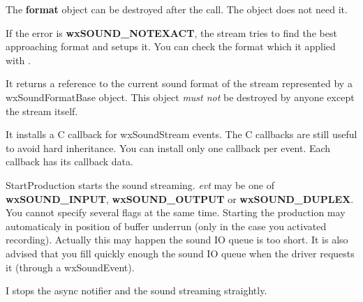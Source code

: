 
The {\bf format} object can be destroyed after the call. The object does not need it.


If the error is {\bf wxSOUND\_NOTEXACT}, the stream tries to find the best
approaching format and setups it. You can check the format which it applied
with .

\label{wxsoundstreamgetsoundformat}

It returns a reference to the current sound format of the stream represented by a
wxSoundFormatBase object. This object {\it must not} be destroyed by anyone except
the stream itself.

\label{wxsoundstreamregister}


It installs a C callback for wxSoundStream events. The C callbacks are still
useful to avoid hard inheritance. You can install only one callback per event.
Each callback has its callback data.

\label{wxsoundstreamstartproduction}


StartProduction starts the sound streaming. {\it evt} may be one of 
{\bf wxSOUND\_INPUT}, {\bf wxSOUND\_OUTPUT} or {\bf wxSOUND\_DUPLEX}.
You cannot specify several flags at the same time. Starting the production
may automaticaly in position of buffer underrun (only in the case you activated
recording). Actually this may happen the sound IO queue is too short.
It is also advised that you fill quickly enough the sound IO queue when the
driver requests it (through a wxSoundEvent).

\label{wxsoundstreamstopproduction}


I stops the async notifier and the sound streaming straightly.

\label{wxsoundstreamseteventhandler}

